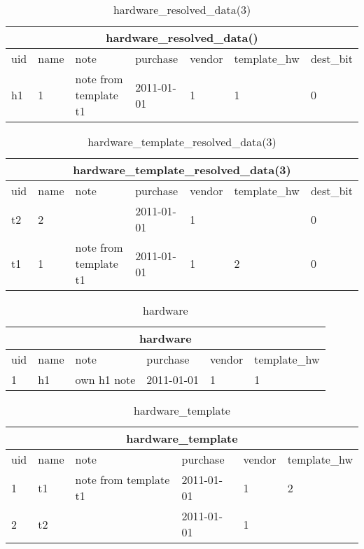 \documentclass[deska]{subfiles}
\begin{document}
\begin{center}

\begin{table}
    \caption{hardware\_resolved\_data(3)}
    \label{tab-templ-hwres2}
\begin{tabular}{ | l | l | l | l | l | l | l |}
    \hline
    \multicolumn{7}{|c|}{hardware\_resolved\_data()}\\
    \hline
    uid & name & note & purchase & vendor & template\_hw & dest\_bit\\
    \hline
    h1 & 1 & note from template t1 & 2011-01-01 & 1 & 1 & 0\\
    \hline
\end{tabular}
\end{table}

\begin{table}
    \caption{hardware\_template\_resolved\_data(3)}
    \label{tab-templ-hwtemplres2}
\begin{tabular}{ | l | l | l | l | l | l | l |}
    \hline
    \multicolumn{7}{|c|}{hardware\_template\_resolved\_data(3)}\\
    \hline
    uid & name & note & purchase & vendor & template\_hw & dest\_bit\\
    \hline
    t2 & 2 &  & 2011-01-01 & 1 &  & 0\\
    t1 & 1 & note from template t1 & 2011-01-01 & 1 & 2 & 0\\
    \hline
\end{tabular}
\end{table}

\begin{table}
    \caption{hardware}
    \label{tab-templ-hw}
\begin{tabular}{ | l | l | l | l | l | l |}
    \hline
    \multicolumn{6}{|c|}{hardware}\\
    \hline
    uid & name & note & purchase & vendor & template\_hw\\
    \hline
    1 & h1 & own h1 note & 2011-01-01 & 1 & 1\\
    \hline
\end{tabular}
\end{table}

\begin{table}
    \caption{hardware\_template}
    \label{tab-templ-hwtempl}
\begin{tabular}{ | l | l | l | l | l | l |}
    \hline
    \multicolumn{6}{|c|}{hardware\_template}\\
    \hline
    uid & name & note & purchase & vendor & template\_hw\\
    \hline
    1 & t1 & note from template t1 & 2011-01-01 & 1 & 2\\
    2 & t2 &  & 2011-01-01 & 1 & \\
    \hline
\end{tabular}
\end{table}

\end{center}
\end{document}
